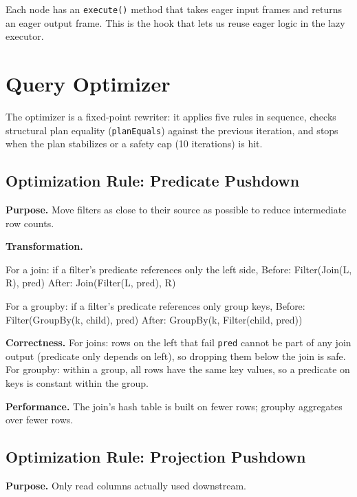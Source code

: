 \documentclass[11pt]{article}
\let\oldverbatim=\verbatim
\let\oldendverbatim=\endverbatim
\renewenvironment{verbatim}{\vspace{-6pt}\oldverbatim}{\oldendverbatim\vspace{-4pt}}
\begin{document}
Each node has an \texttt{execute()} method that takes eager input frames 
and returns an eager output frame. This is the hook that lets us reuse eager 
logic in the lazy executor.

\section{Query Optimizer}

The optimizer is a fixed-point rewriter: it applies five rules in sequence, 
checks structural plan equality (\texttt{planEquals}) against the previous 
iteration, and stops when the plan stabilizes or a safety cap (10 iterations) 
is hit.

\subsection{Optimization Rule: Predicate Pushdown}

\textbf{Purpose.} Move filters as close to their source as possible to reduce 
intermediate row counts.

\textbf{Transformation.} 

For a join: if a filter's predicate references only the left side,
\begin{verbatim}
Before: Filter(Join(L, R), pred)
After:  Join(Filter(L, pred), R)
\end{verbatim}

For a groupby: if a filter's predicate references only group keys,
\begin{verbatim}
Before: Filter(GroupBy(k, child), pred)
After:  GroupBy(k, Filter(child, pred))
\end{verbatim}

\textbf{Correctness.} For joins: rows on the left that fail \texttt{pred} 
cannot be part of any join output (predicate only depends on left), so dropping 
them below the join is safe. For groupby: within a group, all rows have the 
same key values, so a predicate on keys is constant within the group.

\textbf{Performance.} The join's hash table is built on fewer rows; groupby 
aggregates over fewer rows.

\subsection{Optimization Rule: Projection Pushdown}

\textbf{Purpose.} Only read columns actually used downstream.
\end{document}
